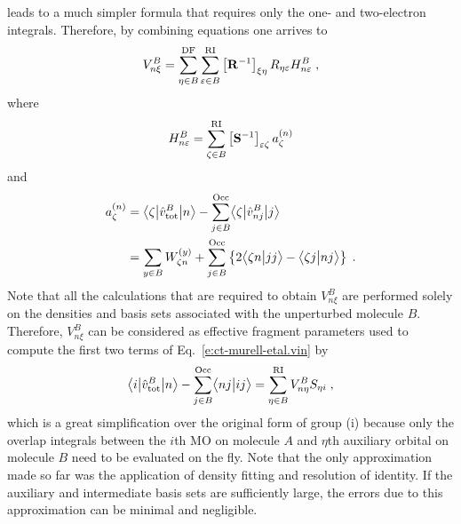 %
leads to a much simpler formula
that requires only the one- and two\hyp{}electron integrals. 
Therefore, by combining
equations %
one arrives to
%
\begin{equation}
 V^B_{n\xi} = \sum_{\eta\in B}^{\rm DF} 
          \sum_{\varepsilon\in B}^{\rm RI}
         \left[ {\bf R}^{-1} \right]_{\xi\eta}
         R_{\eta \varepsilon} 
         H_{n\varepsilon}^B \;,
\end{equation}
%
where
%
\begin{equation}
 H_{n\varepsilon}^B = \sum_{\zeta\in B}^{\rm RI} \left[ {\bf S}^{-1} \right]_{\varepsilon\zeta}
   a_\zeta^{(n)}
\end{equation}
%
and
\begin{align}
 a^{(n)}_\zeta &= \bigl\langle {\zeta} \bigl\lvert {\hat{v}^B_{\rm tot}} \bigl\lvert {n} \bigr\rangle
      - \sum_{j\in B}^{\rm Occ} \bigl\langle {\zeta} \bigl\lvert {\hat{v}^B_{nj}} \bigl\lvert {j} \bigr\rangle \nonumber \\
 &= \sum_{y\in B} W^{(y)}_{\zeta n} 
  + \sum_{j\in B}^{\rm Occ} 
  \left\{
   2\bigl\langle {\zeta n} \bigl\lvert {jj} \bigr\rangle - \bigl\langle {\zeta j} \bigl\lvert {nj} \bigr\rangle 
  \right\} \;.
\end{align}
%
Note that all the calculations that are required to obtain $V^B_{n\xi}$ are performed
solely on the densities and basis sets associated with the unperturbed molecule $B$.
Therefore, $V^B_{n\xi}$ can be considered as effective fragment parameters
used to compute the first two terms of Eq.~\eqref{e:ct-murell-etal.vin} by
%
\begin{equation} \label{e:ct.group-i.final}
        \bigl\langle {i} \bigl\lvert {\hat{v}^B_{\rm tot} } \bigl\lvert {n} \bigr\rangle 
      - \sum_{j\in B}^{\rm Occ} \bigl\langle {nj} \bigl\lvert {ij} \bigr\rangle 
       = \sum_{\eta\in B}^{\rm RI} V^B_{n\eta} S_{\eta i} \;,
\end{equation}
%
which is a great simplification over the original form of group (i)
because only the overlap integrals between the $i$th MO on molecule $A$
and $\eta$th auxiliary orbital on molecule $B$ need to be evaluated on the fly.
Note that the only approximation made so far was the application of density fitting
and resolution of identity. If the auxiliary and intermediate
basis sets are sufficiently large, the errors
due to this approximation can be minimal and negligible.




